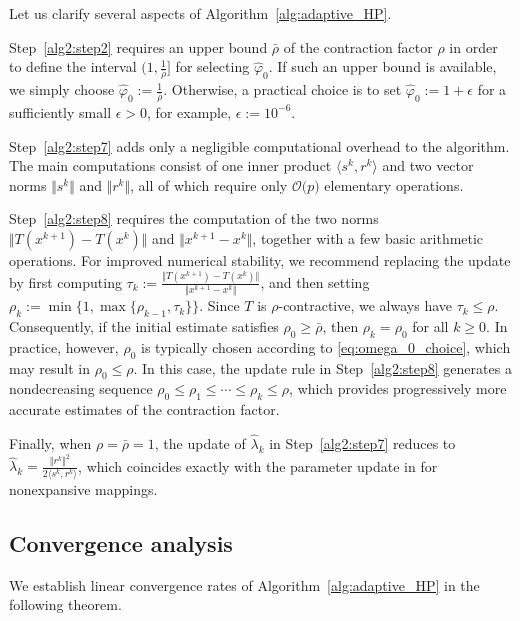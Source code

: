 \documentclass{article}
\theoremstyle{plain}
\theoremstyle{definition}
\newcommand{\sets}[1]{\{#1\}}
\newcommand{\norms}[1]{\Vert#1\Vert}
\newcommand{\iprods}[1]{\langle #1\rangle}
\newcommand{\0}{\boldsymbol{0}}
\newcommand{\BigOs}[1]{\mathcal{O}\big(#1\big)}
\begin{document}
\noindent
Let us clarify several aspects of Algorithm~\ref{alg:adaptive_HP}.
\begin{compactitem}
\item Step~\ref{alg2:step2} requires an upper bound $\bar{\rho}$ of the contraction factor $\rho$ in order to define the interval $\big(1, \frac{1}{\bar{\rho}}\big]$ for selecting $\hat{\varphi}_0$. 
If such an upper bound is available, we simply choose $\hat{\varphi}_0 := \frac{1}{\bar{\rho}}$. 
Otherwise, a practical choice is to set $\hat{\varphi}_0 := 1 + \epsilon$ for a sufficiently small $\epsilon > 0$, for example, $\epsilon := 10^{-6}$.

\item Step~\ref{alg2:step7} adds only a negligible computational overhead to the algorithm. 
The main computations consist of one inner product $\iprods{s^k, r^k}$ and two vector norms $\norms{s^k}$ and $\norms{r^k}$, all of which require only $\BigOs{p}$ elementary operations.

\item Step~\ref{alg2:step8} requires the computation of the two norms $\norms{T(x^{k+1}) - T(x^k)}$ and $\norms{x^{k+1} - x^k}$, together with a few basic arithmetic operations. For improved numerical stability, we recommend replacing the update by first computing $\tau_k := \frac{\norms{T(x^{k+1}) - T(x^k)}}{\norms{x^{k+1} - x^k}}$, and then setting $\rho_k := \min\sets{1,\max\sets{\rho_{k-1},\tau_k}}$.
Since $T$ is $\rho$-contractive, we always have $\tau_k \leq \rho$. Consequently, if the initial estimate satisfies $\rho_0 \geq \bar{\rho}$, then $\rho_k=\rho_0$ for all $k\ge0$. 
In practice, however, $\rho_0$ is typically chosen according to \eqref{eq:omega_0_choice}, which may result in $\rho_0\leq\rho$. In this case, the update rule in Step~\ref{alg2:step8} generates a nondecreasing sequence $\rho_0\leq\rho_1\leq\cdots\leq\rho_k\leq\rho$, which provides progressively more accurate estimates of the contraction factor.
\end{compactitem}
Finally, when $\rho=\bar{\rho}=1$, the update of $\hat{\lambda}_k$ in Step~\ref{alg2:step7} reduces to $\hat{\lambda}_k=\frac{\norms{r^k}^2}{2\iprods{s^k,r^k}}$,
which coincides exactly with the parameter update in \cite[Algorithm~3.1]{he2024convergence} for nonexpansive mappings.

\subsection{Convergence analysis}\label{subsec:A2_convergence}
We establish linear convergence rates of Algorithm~\ref{alg:adaptive_HP} in the following theorem.
	
\end{document}
